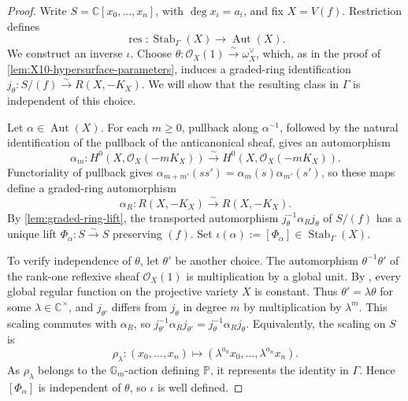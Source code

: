\documentclass[11pt]{article}
\theoremstyle{plain}
\theoremstyle{definition}
\theoremstyle{remark}
\newcommand{\Pp}{\mathbb P}
\newcommand{\C}{\mathbb C}
\newcommand{\OO}{\mathcal O}
\begin{document}
\begin{proof}
Write \(S=\C[x_0,\ldots,x_n]\), with \(\deg x_i=a_i\), and fix
\(X=V(f)\). Restriction defines
\[
\operatorname{res}\colon
\operatorname{Stab}_\Gamma(X)\longrightarrow\operatorname{Aut}(X).
\]
We construct an inverse \(\iota\). Choose
\(\theta:\OO_X(1)\xrightarrow{\sim}\omega_X^\vee\), which, as in the
proof of \cref{lem:X10-hypersurface-parameters}, induces a graded-ring
identification \(j_\theta:S/(f)\xrightarrow{\sim}R(X,-K_X)\). We will
show that the resulting class in \(\Gamma\) is independent of this choice.

Let \(\alpha\in\operatorname{Aut}(X)\). For each \(m\geq0\), pullback
along \(\alpha^{-1}\), followed by the natural identification of the
pullback of the anticanonical sheaf, gives an automorphism
\[
\alpha_m:H^0(X,\OO_X(-mK_X))\xrightarrow{\sim}
H^0(X,\OO_X(-mK_X)).
\]
Functoriality of pullback gives
\(\alpha_{m+m'}(ss')=\alpha_m(s)\alpha_{m'}(s')\), so these maps define
a graded-ring automorphism
\[
\alpha_R:R(X,-K_X)\xrightarrow{\sim}R(X,-K_X).
\]
By \cref{lem:graded-ring-lift}, the transported automorphism
\(j_\theta^{-1}\alpha_Rj_\theta\) of \(S/(f)\) has a unique lift
\(\Phi_\alpha:S\xrightarrow{\sim}S\) preserving \((f)\). Set
\(\iota(\alpha):=[\Phi_\alpha]\in\operatorname{Stab}_\Gamma(X)\).

To verify independence of \(\theta\), let \(\theta'\) be another choice.
The automorphism \(\theta^{-1}\theta'\) of the rank-one reflexive sheaf
\(\OO_X(1)\) is multiplication by a global unit. By
\cite[Chapter~I, Theorem~3.4]{Hartshorne1977}, every global regular
function on the projective variety \(X\) is constant. Thus
\(\theta'=\lambda\theta\) for some \(\lambda\in\C^\times\), and
\(j_{\theta'}\) differs from \(j_\theta\) in degree \(m\) by
multiplication by \(\lambda^m\). This scaling commutes with \(\alpha_R\),
so
\(j_{\theta'}^{-1}\alpha_Rj_{\theta'}=
j_\theta^{-1}\alpha_Rj_\theta\). Equivalently, the scaling on \(S\) is
\[
\rho_\lambda:(x_0,\ldots,x_n)\longmapsto
(\lambda^{a_0}x_0,\ldots,\lambda^{a_n}x_n).
\]
As \(\rho_\lambda\) belongs to the \(\mathbb G_m\)-action defining
\(\Pp\), it represents the identity in \(\Gamma\). Hence
\([\Phi_\alpha]\) is independent of \(\theta\), so \(\iota\) is well
defined.


\end{proof}
\end{document}
